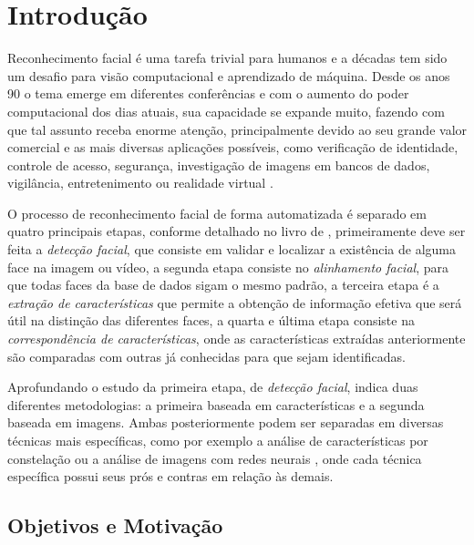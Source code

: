 
\chapter[Introdução]{Introdução}

Reconhecimento facial é uma tarefa trivial para humanos e a décadas tem sido um desafio para visão computacional e aprendizado de máquina. Desde os anos 90 o tema emerge em diferentes conferências e com o aumento do poder computacional dos dias atuais, sua capacidade se expande muito, fazendo com que tal assunto receba enorme atenção, principalmente devido ao seu grande valor comercial e as mais diversas aplicações possíveis, como verificação de identidade, controle de acesso, segurança, investigação de imagens em bancos de dados, vigilância, entretenimento ou realidade virtual \cite{appli2014} \cite{Zhao:2003:FRL:954339.954342}.

O processo de reconhecimento facial de forma automatizada é separado em quatro principais etapas, conforme detalhado no livro de  \cite{Li:2011:HFR:2073486}, primeiramente deve ser feita a \textit{detecção facial}, que consiste em validar e localizar a existência de alguma face na imagem ou vídeo, a segunda etapa consiste no \textit{alinhamento facial}, para que todas faces da base de dados sigam o mesmo padrão, a terceira etapa é a \textit{extração de características} que permite a obtenção de informação efetiva que será útil na distinção das diferentes faces, a quarta e última etapa consiste na \textit{correspondência de características}, onde as características extraídas anteriormente são comparadas com outras já conhecidas para que sejam identificadas.

Aprofundando o estudo da primeira etapa, de \textit{detecção facial},  \cite{faceDetection2001} indica duas diferentes metodologias: a primeira baseada em características e a segunda baseada em imagens. Ambas posteriormente podem ser separadas em diversas técnicas mais específicas, como por exemplo a análise de características por constelação \cite{loy2006detecting} ou a análise de imagens com redes neurais \cite{cnn_face_detection}, onde cada técnica específica possui seus prós e contras em relação às demais.

\section{Objetivos e Motivação}

